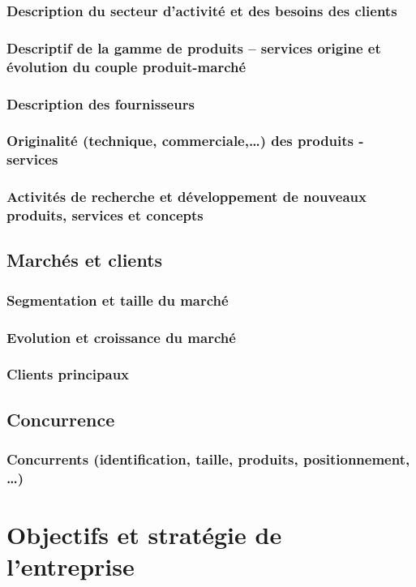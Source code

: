 \documentclass[a4paper]{report}
\begin{document}
\subsection{Description du secteur d'activité et des besoins des clients}

\subsection{Descriptif de la gamme de produits – services origine et
évolution du couple produit-marché}

\subsection{Description des fournisseurs}

\subsection{Originalité (technique, commerciale,…) des produits - services}

\subsection{Activités de recherche et développement de nouveaux produits,
services et concepts}

\section{Marchés et clients}

\subsection{Segmentation et taille du marché}

\subsection{Evolution et croissance du marché}

\subsection{Clients principaux}

\section{Concurrence}

\subsection{Concurrents (identification, taille, produits, positionnement, …)}


\chapter{Objectifs et stratégie de l'entreprise}
\end{document}
